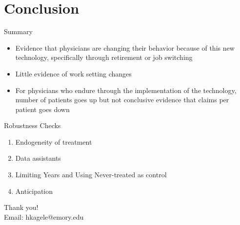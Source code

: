 \documentclass[10pt]{beamer}
\begin{document}
\section{Conclusion}


\begin{frame}{Summary}
\begin{itemize}
    \item Evidence that physicians are changing their behavior because of this new technology, specifically through retirement or job switching
    \vspace{3mm}
    \item Little evidence of work setting changes
    \vspace{3mm}
    \item For physicians who endure through the implementation of the technology, number of patients goes up but not conclusive evidence that claims per patient goes down
    
\end{itemize}
\end{frame}

\begin{frame}{Robustness Checks}
    \begin{enumerate}
        \item Endogeneity of treatment
        \item Data assistants
        \item Limiting Years and Using Never-treated as control
        \item Anticipation
    \end{enumerate}
\end{frame}








\begin{frame}[plain]{}
\centering
    Thank you! \\
    \vspace{5mm}
    Email: hkagele@emory.edu
\end{frame}
\end{document}
